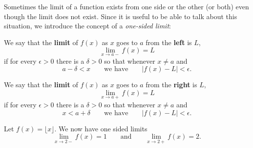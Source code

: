 Sometimes the limit of a function exists from one side or the other
(or both) even though the limit does not exist. Since it is useful to
be able to talk about this situation, we introduce the concept of a
\textit{one-sided limit}:

\begin{definition} We say that the \textbf{limit} of $f(x)$ as $x$ goes to $a$ from the \textbf{left} is $L$,
\[
\lim_{x\to a-}f(x)=L
\]
if for every $\epsilon>0$ there is a $\delta > 0$ so that whenever $x\ne a$ and 
\[
a-\delta < x \qquad\text{we have}\qquad |f(x)-L|<\epsilon.
\]

We say that the \textbf{limit} of $f(x)$ as $x$ goes to $a$ from the \textbf{right} is $L$,
\[
\lim_{x\to a+}f(x)=L
\] 
if for every $\epsilon>0$ there is a $\delta > 0$ so that whenever $x \ne a$ and 
\[
x<a+\delta \qquad\text{we have}\qquad |f(x)-L|<\epsilon.
\]
\end{definition}



\begin{example}
Let $f(x) = \lfloor x\rfloor$. We now have one sided limits 
\[
\lim_{x\to 2-} f(x) = 1 \qquad\text{and}\qquad \lim_{x\to 2+} f(x) = 2.
\]
\end{example}




